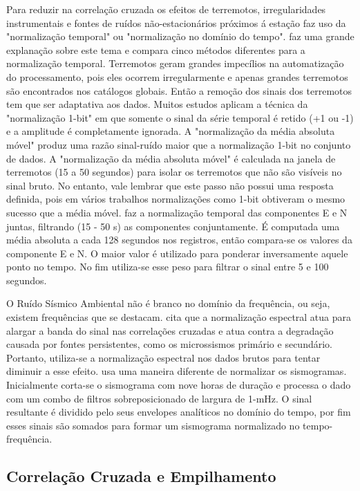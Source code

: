 \documentclass[paper,twocolumn]{geophysics}
\begin{document}
Para reduzir na correlação cruzada os efeitos de terremotos, irregularidades instrumentais e fontes de ruídos não-estacionários próximos á estação \cite{bensen_processing_2007} faz uso da "normalização temporal" ou "normalização no domínio do tempo". \cite{bensen_processing_2007} faz uma grande explanação sobre este tema e compara cinco métodos diferentes para a normalização temporal. Terremotos geram grandes impecílios na automatização do processamento, pois eles ocorrem irregularmente e apenas grandes terremotos são encontrados nos catálogos globais. Então a remoção dos sinais dos terremotos tem que ser adaptativa aos dados. Muitos estudos aplicam a técnica da "normalização 1-bit" em que somente o sinal da série temporal é retido (+1 ou -1) e a amplitude é completamente ignorada. A "normalização da média absoluta móvel" produz uma razão sinal-ruído maior que a normalização 1-bit no conjunto de dados. A "normalização da média absoluta móvel" é calculada na janela de terremotos (15 a 50 segundos) para isolar os terremotos que não são visíveis no sinal bruto. No entanto, vale lembrar que este passo não possui uma resposta definida, pois em vários trabalhos normalizações como 1-bit obtiveram o mesmo sucesso que a média móvel. \cite{lin_surface_2008} faz a normalização temporal das componentes E e N juntas, filtrando (15 - 50 s) as componentes conjuntamente. É computada uma média absoluta a cada 128 segundos nos registros, então compara-se os valores da componente E e N. O maior valor é utilizado para ponderar inversamente aquele ponto no tempo. No fim utiliza-se esse peso para filtrar o sinal entre 5 e 100 segundos. 

O Ruído Sísmico Ambiental não é branco no domínio da frequência, ou seja, existem frequências que se destacam. \cite{bensen_processing_2007} cita que a normalização espectral atua para alargar a banda do sinal nas correlações cruzadas e atua contra a degradação causada por fontes persistentes, como os microssismos primário e secundário. Portanto, utiliza-se a normalização espectral nos dados brutos para tentar diminuir a esse efeito. \cite{ekstrom_determination_2009} usa uma maneira diferente de normalizar os sismogramas. Inicialmente corta-se o sismograma com nove horas de duração e processa o dado com um combo de filtros sobreposicionado de largura de 1-mHz. O sinal resultante é dividido pelo seus envelopes analíticos no domínio do tempo, por fim esses sinais são somados para formar um sismograma normalizado no tempo-frequência.

\subsection*{Correlação Cruzada e Empilhamento}
\end{document}
